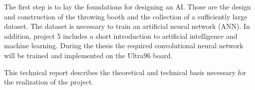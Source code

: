 The first step is to lay the foundations for designing an AI.
Those are the design and construction of the throwing booth and the collection of a sufficiently large dataset.
The dataset is necessary to train an artificial neural network (ANN).
In addition, project 5 includes a short introduction to artificial intelligence and machine learning.
During the thesis the required convolutional neural network will be trained and implemented on the Ultra96 board.

This technical report describes the theoretical and technical basis necessary for the realization of the project.

